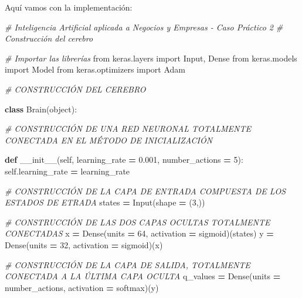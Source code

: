 \documentclass[
]{book}
\newenvironment{Shaded}{\begin{snugshade}}{\end{snugshade}}
\newcommand{\BuiltInTok}[1]{#1}
\newcommand{\CommentTok}[1]{\textcolor[rgb]{0.56,0.35,0.01}{\textit{#1}}}
\newcommand{\DecValTok}[1]{\textcolor[rgb]{0.00,0.00,0.81}{#1}}
\newcommand{\FloatTok}[1]{\textcolor[rgb]{0.00,0.00,0.81}{#1}}
\newcommand{\FunctionTok}[1]{\textcolor[rgb]{0.00,0.00,0.00}{#1}}
\newcommand{\ImportTok}[1]{#1}
\newcommand{\KeywordTok}[1]{\textcolor[rgb]{0.13,0.29,0.53}{\textbf{#1}}}
\newcommand{\NormalTok}[1]{#1}
\newcommand{\OperatorTok}[1]{\textcolor[rgb]{0.81,0.36,0.00}{\textbf{#1}}}
\newcommand{\StringTok}[1]{\textcolor[rgb]{0.31,0.60,0.02}{#1}}
\newcommand{\VariableTok}[1]{\textcolor[rgb]{0.00,0.00,0.00}{#1}}
\begin{document}
Aquí vamos con la implementación:\\

\begin{Shaded}
\begin{Highlighting}[]
\CommentTok{\# Inteligencia Artificial aplicada a Negocios y Empresas {-} Caso Práctico 2}
\CommentTok{\# Construcción del cerebro}

\CommentTok{\# Importar las librerías}
\ImportTok{from}\NormalTok{ keras.layers }\ImportTok{import}\NormalTok{ Input, Dense}
\ImportTok{from}\NormalTok{ keras.models }\ImportTok{import}\NormalTok{ Model}
\ImportTok{from}\NormalTok{ keras.optimizers }\ImportTok{import}\NormalTok{ Adam}

\CommentTok{\# CONSTRUCCIÓN DEL CEREBRO}

\KeywordTok{class}\NormalTok{ Brain(}\BuiltInTok{object}\NormalTok{):}
    
    \CommentTok{\# CONSTRUCCIÓN DE UNA RED NEURONAL TOTALMENTE CONECTADA EN EL MÉTODO DE INICIALIZACIÓN}
    
    \KeywordTok{def} \FunctionTok{\_\_init\_\_}\NormalTok{(}\VariableTok{self}\NormalTok{, learning\_rate }\OperatorTok{=} \FloatTok{0.001}\NormalTok{, number\_actions }\OperatorTok{=} \DecValTok{5}\NormalTok{):}
        \VariableTok{self}\NormalTok{.learning\_rate }\OperatorTok{=}\NormalTok{ learning\_rate}
        
        \CommentTok{\# CONSTRUCCIÓN DE LA CAPA DE ENTRADA COMPUESTA DE LOS ESTADOS DE ETRADA}
\NormalTok{        states }\OperatorTok{=}\NormalTok{ Input(shape }\OperatorTok{=}\NormalTok{ (}\DecValTok{3}\NormalTok{,))}
        
        \CommentTok{\# CONSTRUCCIÓN DE LAS DOS CAPAS OCULTAS TOTALMENTE CONECTADAS}
\NormalTok{        x }\OperatorTok{=}\NormalTok{ Dense(units }\OperatorTok{=} \DecValTok{64}\NormalTok{, activation }\OperatorTok{=} \StringTok{\textquotesingle{}sigmoid\textquotesingle{}}\NormalTok{)(states)}
\NormalTok{        y }\OperatorTok{=}\NormalTok{ Dense(units }\OperatorTok{=} \DecValTok{32}\NormalTok{, activation }\OperatorTok{=} \StringTok{\textquotesingle{}sigmoid\textquotesingle{}}\NormalTok{)(x)}
        
        \CommentTok{\# CONSTRUCCIÓN DE LA CAPA DE SALIDA, TOTALMENTE CONECTADA A LA ÚLTIMA CAPA OCULTA}
\NormalTok{        q\_values }\OperatorTok{=}\NormalTok{ Dense(units }\OperatorTok{=}\NormalTok{ number\_actions, activation }\OperatorTok{=} \StringTok{\textquotesingle{}softmax\textquotesingle{}}\NormalTok{)(y)}
        

\end{Highlighting}
\end{Shaded}
\end{document}

